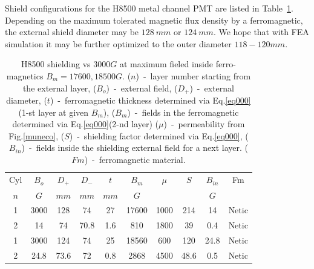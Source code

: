 \documentclass[12pt]{article}
\begin{document}
Shield configurations for the H8500 metal channel PMT are listed 
 in Table~\ref{H8500at17600}.
Depending on the maximum  tolerated magnetic flux density by a ferromagnetic,
the external shield diameter may be $128~mm$ or $124~mm$.  
We hope that with FEA simulation it may be further optimized
to the outer diameter $118-120mm$.



\begin{table}[htbp]
\begin{center}
\begin{tabular}{|c|c|c|c|c|c|c|c|c|c|} \hline
Cyl&$B_{o}$& $D_+$ & $D_-$ & $t$  & $B_m$  & $\mu$   & $S$    &$B_{in}$         & Fm \\
$n$&$G$    & $mm$  & $mm$  & $mm$ & $G$   &         &        &$G$             &       \\ \hline  
1 &3000    &  128  &  74   & 27   &  17600 &  1000   &  214   &  14             & Netic \\
2 &14      &  74   &  70.8 & 1.6  &  810   &  1800   &  39    & 0.4             & Netic  \\ \hline \hline
1&3000     &   124 &  74   & 25   & 18560  & 600     & 120    & 24.8            & Netic \\ 
2&24.8     & 73.6  &  72   & 0.8  & 2868   & 4500    & 48.6   & 0.5             & Netic \\ \hline
\end{tabular}                                                      
\end{center}
\caption{H8500 shielding  vs  $3000G$  at maximum
fieled inside  ferro-magnetics  $B_m=17600,18500G$.
($n$)~-~layer number starting from the external layer,
($B_{o}$)~-~external field,
($D_+$)~-~external diameter,
($t$)~-~ferromagnetic thickness determined  via   Eq.\ref{eq000}(1-st layer at given $B_m$),
($B_m$)~-~fields in the ferromagnetic determined via  Eq.\ref{eq000}(2-nd layer)
($\mu$)~-~permeability  from Fig.\ref{muneco},
($S$)~-~shielding factor determined via  Eq.\ref{eq000},
($B_{in}$)~-~fields inside the shielding external field for a next layer.
($Fm$)~-~ferromagnetic material. \label{H8500at17600} }
\end{table}
\end{document}
